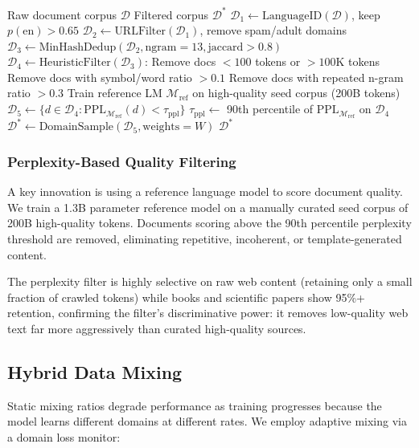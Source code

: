 \documentclass[11pt,a4paper]{article}
\begin{document}
\begin{algorithm}[H]
\caption{Zen Quality Filtering Pipeline}
\begin{algorithmic}[1]
\REQUIRE Raw document corpus $\mathcal{D}$
\ENSURE Filtered corpus $\mathcal{D}^*$
\STATE $\mathcal{D}_1 \leftarrow \text{LanguageID}(\mathcal{D})$, keep $p(\text{en}) > 0.65$
\STATE $\mathcal{D}_2 \leftarrow \text{URLFilter}(\mathcal{D}_1)$, remove spam/adult domains
\STATE $\mathcal{D}_3 \leftarrow \text{MinHashDedup}(\mathcal{D}_2, \text{ngram}=13, \text{jaccard}>0.8)$
\STATE $\mathcal{D}_4 \leftarrow \text{HeuristicFilter}(\mathcal{D}_3)$:
\STATE \quad Remove docs $< 100$ tokens or $> 100$K tokens
\STATE \quad Remove docs with symbol/word ratio $> 0.1$
\STATE \quad Remove docs with repeated n-gram ratio $> 0.3$
\STATE Train reference LM $\mathcal{M}_\text{ref}$ on high-quality seed corpus (200B tokens)
\STATE $\mathcal{D}_5 \leftarrow \{d \in \mathcal{D}_4 : \text{PPL}_{\mathcal{M}_\text{ref}}(d) < \tau_\text{ppl}\}$
\STATE $\tau_\text{ppl} \leftarrow$ 90th percentile of $\text{PPL}_{\mathcal{M}_\text{ref}}$ on $\mathcal{D}_4$
\STATE $\mathcal{D}^* \leftarrow \text{DomainSample}(\mathcal{D}_5, \text{weights}=W)$
\RETURN $\mathcal{D}^*$
\end{algorithmic}
\end{algorithm}

\subsubsection{Perplexity-Based Quality Filtering}

A key innovation is using a reference language model to score document quality.
We train a 1.3B parameter reference model on a manually curated seed corpus of
200B high-quality tokens. Documents scoring above the 90th percentile perplexity
threshold are removed, eliminating repetitive, incoherent, or template-generated content.

The perplexity filter is highly selective on raw web content (retaining only a small
fraction of crawled tokens) while books and scientific papers show 95\%+ retention,
confirming the filter's discriminative power: it removes low-quality web text far more
aggressively than curated high-quality sources.

\subsection{Hybrid Data Mixing}

Static mixing ratios degrade performance as training progresses because the model
learns different domains at different rates. We employ adaptive mixing via a
domain loss monitor:
\end{document}
